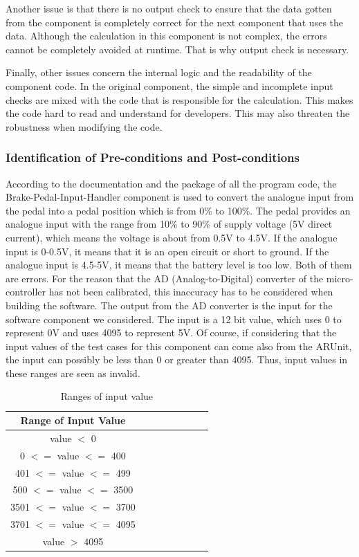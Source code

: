 Another issue is that there is no output check to ensure that the data gotten from the component is completely correct for the next component that uses the data. Although the calculation in this component is not complex, the errors cannot be completely avoided at runtime. That is why output check is necessary.

Finally, other issues concern the internal logic and the readability of the component code. In the original component, the simple and incomplete input checks are mixed with the code that is responsible for the calculation. This makes the code hard to read and understand for developers. This may also threaten the robustness when modifying the code. 

\subsubsection{Identification of Pre-conditions and Post-conditions}

According to the documentation %
and the package of all the program code, the Brake-Pedal-Input-Handler component is used to convert the analogue input from the pedal into a pedal position which is from 0\% to 100\%. The pedal provides an analogue input with the range from 10\% to 90\% of supply voltage (5V direct current), which means the voltage is about from 0.5V to 4.5V. If the analogue input is 0-0.5V, it means that it is an open circuit or short to ground. If the analogue input is 4.5-5V, it means that the battery level is too low. %
Both of them are errors. For the reason that the AD (Analog-to-Digital) converter of the micro-controller has not been calibrated, this inaccuracy has to be considered when building the software. %
The output from the AD converter is the input for the software component we considered. The input is a 12 bit value, which uses 0 to represent 0V and uses 4095 to represent 5V. Of course, if considering that the input values of the test cases for this component can come also from the ARUnit, the input can possibly be less than 0 or greater than 4095. Thus, input values in these ranges are seen as invalid.

\begin{table}[htb]
\centering
\begin{tabular}{|c|c|c|c|c|c|c|c|}\hline
Range of Input Value\\ \hline
value $<$ 0\\ \hline
0 $<=$ value $<=$ 400\\ \hline
401 $<=$ value $<=$ 499\\ \hline
500 $<=$ value $<=$ 3500\\ \hline
3501 $<=$ value $<=$ 3700\\ \hline
3701 $<=$ value $<=$ 4095\\ \hline
value $>$ 4095\\ \hline
\end{tabular}
\caption{Ranges of input value}
\label{tab:BPIHRanegInput}
\vspace{-.4cm}
\end{table}

